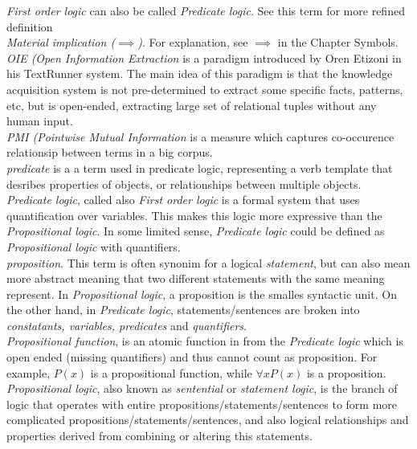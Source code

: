 \emph {First order logic} can also be called \emph{Predicate logic}. See this
term for more refined definition\\

\emph{Material implication ($\implies$)}. For explanation, see $\implies$ in the
Chapter Symbols.\\

\emph{OIE (Open Information Extraction} is a paradigm introduced by Oren Etizoni
in his TextRunner system. The main idea of this paradigm is that the knowledge 
acquisition system is not pre-determined to extract some specific facts, 
patterns, etc, but is open-ended, extracting large set of relational tuples 
without any human input.\\

\emph{PMI (Pointwise Mutual Information} is a measure which captures 
co-occurence relationsip between terms in a big corpus.\\

\emph{predicate} is a a term used in predicate logic, representing a verb
template that desribes properties of objects, or relationships between multiple
objects.\\

\emph{Predicate logic}, called also \emph{First order logic} is a formal system
that uses quantification over variables. This makes this logic more expressive
than the \emph{Propositional logic}. In some limited sense, 
\emph{Predicate logic} could be defined as \emph{Propositional logic} with 
quantifiers.\\

\emph{proposition}. This term is often synonim for a logical \emph{statement},
but can also mean more abstract meaning that two different statements with the
same meaning represent. In \emph{Propositional logic}, a proposition is the
smalles syntactic unit. On the other hand, in \emph{Predicate logic}, 
statements/sentences are broken into \emph{constatants, variables, predicates}
and \emph{quantifiers}.\\

\emph{Propositional function}, is an atomic function in from the 
\emph{Predicate logic} which is open ended (missing quantifiers) and thus
cannot count as proposition. For example, $P(x)$ is a propositional function,
while $\forall x P(x)$ is a proposition.\\

\emph{Propositional logic}, also known as \emph{sentential} or 
\emph{statement logic}, is the branch of logic that operates with entire
propositions/statements/sentences to form more complicated 
propositions/statements/sentences, and also logical relationships and properties
derived from combining  or altering this statements.\\

